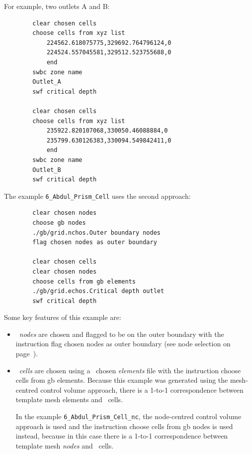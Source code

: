 For example, two outlets A and B:
\begin{verbatim}
        clear chosen cells
        choose cells from xyz list
            224562.618075775,329692.764796124,0
            224524.557045581,329512.523755688,0
            end
        swbc zone name
        Outlet_A
        swf critical depth

        clear chosen cells
        choose cells from xyz list
            235922.820107068,330050.46088884,0
            235799.630126383,330094.549842411,0
            end
        swbc zone name
        Outlet_B
        swf critical depth
\end{verbatim}

The example \texttt{6\_Abdul\_Prism\_Cell} uses the second approach:
\begin{verbatim}
        clear chosen nodes
        choose gb nodes
        ./gb/grid.nchos.Outer boundary nodes
        flag chosen nodes as outer boundary

        clear chosen cells
        clear chosen nodes
        choose cells from gb elements
        ./gb/grid.echos.Critical depth outlet
        swf critical depth
\end{verbatim}

Some key features of this example are:
\begin{itemize}
    \item \swf\ {\em nodes} are chosen and flagged to be on the outer boundary with the instruction {\sf flag chosen nodes as outer boundary} (see node selection on page~\pageref{page:nodeSelect}).
    \item \swf\ {\em cells} are chosen using a \gb\ chosen {\em elements} file with the instruction {\sf choose cells from gb elements}.  Because this example was generated using the mesh-centred control volume approach, there is a 1-to-1 correspondence between template mesh elements and \swf\ cells.

        In the example \texttt{6\_Abdul\_Prism\_Cell\_nc}, the node-centred control volume approach is used and the instruction {\sf choose cells from gb nodes} is used instead, because in this case there is a 1-to-1 correspondence between template mesh {\em nodes} and \swf\ cells.
\end{itemize}
